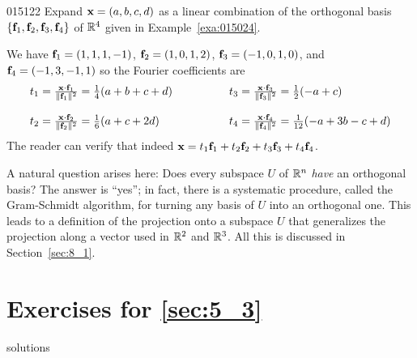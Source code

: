 \begin{example}{}{015122}
Expand $\textbf{x} = (a, b, c, d)$ as a linear combination of the orthogonal basis $\{\textbf{f}_{1}, \textbf{f}_{2}, \textbf{f}_{3}, \textbf{f}_{4}\}$ of $\mathbb{R}^4$ given in Example~\ref{exa:015024}.

\newpage
\begin{solution}
We have $\textbf{f}_{1} = (1, 1, 1, -1)$, $\textbf{f}_{2} = (1, 0, 1, 2)$, $\textbf{f}_{3} = (-1, 0, 1, 0)$, and $\textbf{f}_{4} = (-1, 3, -1, 1)$ so the Fourier coefficients are
\begin{equation*}
\begin{array}{lcl}
	t_1 = \tfrac{\textbf{x} \cdot \textbf{f}_1}{\|\textbf{f}_1\|^2} = \tfrac{1}{4}(a + b + c + d) & \hspace{3em} &
	t_3 = \tfrac{\textbf{x} \cdot \textbf{f}_3}{\|\textbf{f}_3\|^2} = \tfrac{1}{2}(-a + c) \\
	& \\
	t_2 = \tfrac{\textbf{x} \cdot \textbf{f}_2}{\|\textbf{f}_2\|^2} = \tfrac{1}{6}(a + c + 2d) & &
	t_4 = \tfrac{\textbf{x} \cdot \textbf{f}_4}{\|\textbf{f}_4\|^2} = \tfrac{1}{12}(-a + 3b -c + d)
\end{array}
\end{equation*}
The reader can verify that indeed $\textbf{x} = t_{1}\textbf{f}_{1} + t_{2}\textbf{f}_{2} + t_{3}\textbf{f}_{3} + t_{4}\textbf{f}_{4}$.
\end{solution}
\end{example}

A natural question arises here: Does every subspace $U$ of $\mathbb{R}^n$ \textit{have} an orthogonal basis? The answer is ``yes''; in fact, there is a systematic procedure, called the Gram-Schmidt algorithm, for turning any basis of $U$ into an orthogonal one. This leads to a definition of the projection onto a subspace $U$ that generalizes the projection along a vector used in $\mathbb{R}^2$ and $\mathbb{R}^3$. All this is discussed in Section~\ref{sec:8_1}.

\section*{Exercises for \ref{sec:5_3}}

\begin{Filesave}{solutions}
\end{Filesave}

